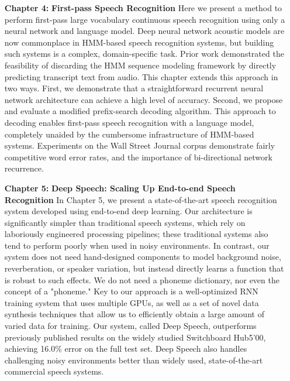 \begin{itemize}
    \item [{\bf Chapter 4:}]{\bf First-pass Speech Recognition} Here we present
        a method to perform first-pass large vocabulary continuous speech
        recognition using only a neural network and language model. Deep neural
        network acoustic models are now commonplace in HMM-based speech
        recognition systems, but building such systems is a complex,
        domain-specific task. Prior work demonstrated the feasibility of
        discarding the HMM sequence modeling framework by directly predicting
        transcript text from audio. This chapter extends this approach in two
        ways. First, we demonstrate that a straightforward recurrent neural
        network architecture can achieve a high level of accuracy. Second, we
        propose and evaluate a modified prefix-search decoding algorithm. This
        approach to decoding enables first-pass speech recognition with a
        language model, completely unaided by the cumbersome infrastructure of
        HMM-based systems. Experiments on the Wall Street Journal corpus
        demonstrate fairly competitive word error rates, and the importance of
        bi-directional network recurrence. 

    \item [{\bf Chapter 5:}]{\bf Deep Speech: Scaling Up End-to-end Speech
        Recognition} In Chapter 5, we present a state-of-the-art speech
        recognition system developed using end-to-end deep learning. Our
        architecture is significantly simpler than traditional speech systems,
        which rely on laboriously engineered processing pipelines; these
        traditional systems also tend to perform poorly when used in noisy
        environments. In contrast, our system does not need hand-designed
        components to model background noise, reverberation, or speaker
        variation, but instead directly learns a function that is robust to
        such effects. We do not need a phoneme dictionary, nor even the concept
        of a "phoneme." Key to our approach is a well-optimized RNN training
        system that uses multiple GPUs, as well as a set of novel data
        synthesis techniques that allow us to efficiently obtain a large amount
        of varied data for training. Our system, called Deep Speech,
        outperforms previously published results on the widely studied
        Switchboard Hub5'00, achieving 16.0\% error on the full test set. Deep
        Speech also handles challenging noisy environments better than widely
        used, state-of-the-art commercial speech systems.


\end{itemize}
